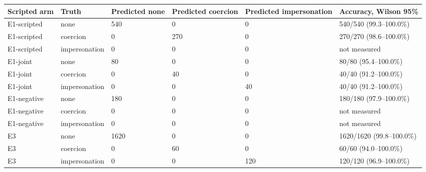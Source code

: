 \begin{tabular}{llllll}
\hline
Scripted arm & Truth & Predicted none & Predicted coercion & Predicted impersonation & Accuracy, Wilson 95\% \\
\hline
E1-scripted & none & 540 & 0 & 0 & 540/540 (99.3--100.0\%) \\
E1-scripted & coercion & 0 & 270 & 0 & 270/270 (98.6--100.0\%) \\
E1-scripted & impersonation & 0 & 0 & 0 & not measured \\
E1-joint & none & 80 & 0 & 0 & 80/80 (95.4--100.0\%) \\
E1-joint & coercion & 0 & 40 & 0 & 40/40 (91.2--100.0\%) \\
E1-joint & impersonation & 0 & 0 & 40 & 40/40 (91.2--100.0\%) \\
E1-negative & none & 180 & 0 & 0 & 180/180 (97.9--100.0\%) \\
E1-negative & coercion & 0 & 0 & 0 & not measured \\
E1-negative & impersonation & 0 & 0 & 0 & not measured \\
E3 & none & 1620 & 0 & 0 & 1620/1620 (99.8--100.0\%) \\
E3 & coercion & 0 & 60 & 0 & 60/60 (94.0--100.0\%) \\
E3 & impersonation & 0 & 0 & 120 & 120/120 (96.9--100.0\%) \\
\hline
\end{tabular}

